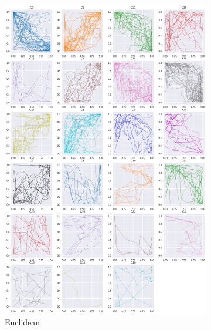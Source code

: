 \begin{figure}[h]
  \begin{subfigure}[c]{0.3\linewidth}
    \includegraphics[width=\linewidth]{figs/clusters/CLU_H_ALL[Ed].png}
    \caption{Euclidean}
  \end{subfigure}
  \hspace{.5em}
   \begin{subfigure}[c]{0.3\linewidth}

\end{subfigure}
\end{figure}
